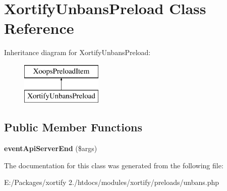 \hypertarget{class_xortify_unbans_preload}{\section{Xortify\-Unbans\-Preload Class Reference}
\label{class_xortify_unbans_preload}
}
Inheritance diagram for Xortify\-Unbans\-Preload\-:\begin{figure}[H]
\begin{center}
\leavevmode
\includegraphics[height=2.000000cm]{class_xortify_unbans_preload}
\end{center}
\end{figure}
\subsection*{Public Member Functions}
\begin{DoxyCompactItemize}
\item 
\hypertarget{class_xortify_unbans_preload_a9c08e9e088954ef29b76a4e76a5d43c9}{{\bfseries event\-Api\-Server\-End} (\$args)}\label{class_xortify_unbans_preload_a9c08e9e088954ef29b76a4e76a5d43c9}

\end{DoxyCompactItemize}


The documentation for this class was generated from the following file\-:\begin{DoxyCompactItemize}
\item 
E\-:/\-Packages/xortify 2./htdocs/modules/xortify/preloads/unbans.\-php\end{DoxyCompactItemize}
